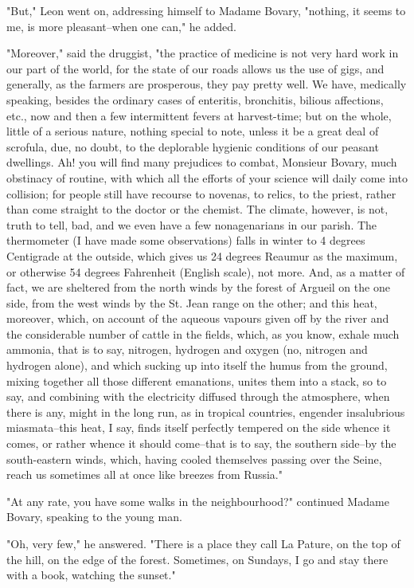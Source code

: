 \documentclass{tufte-book}
\begin{document}
"But," Leon went on, addressing himself to Madame Bovary, "nothing, it
seems to me, is more pleasant--when one can," he added.

"Moreover," said the druggist, "the practice of medicine is not very
hard work in our part of the world, for the state of our roads allows us
the use of gigs, and generally, as the farmers are prosperous, they pay
pretty well. We have, medically speaking, besides the ordinary cases
of enteritis, bronchitis, bilious affections, etc., now and then a
few intermittent fevers at harvest-time; but on the whole, little of a
serious nature, nothing special to note, unless it be a great deal of
scrofula, due, no doubt, to the deplorable hygienic conditions of our
peasant dwellings. Ah! you will find many prejudices to combat, Monsieur
Bovary, much obstinacy of routine, with which all the efforts of your
science will daily come into collision; for people still have recourse
to novenas, to relics, to the priest, rather than come straight to the
doctor or the chemist. The climate, however, is not, truth to tell, bad,
and we even have a few nonagenarians in our parish. The thermometer (I
have made some observations) falls in winter to 4 degrees Centigrade
at the outside, which gives us 24 degrees Reaumur as the maximum, or
otherwise 54 degrees Fahrenheit (English scale), not more. And, as a
matter of fact, we are sheltered from the north winds by the forest of
Argueil on the one side, from the west winds by the St. Jean range on
the other; and this heat, moreover, which, on account of the aqueous
vapours given off by the river and the considerable number of cattle
in the fields, which, as you know, exhale much ammonia, that is to say,
nitrogen, hydrogen and oxygen (no, nitrogen and hydrogen alone), and
which sucking up into itself the humus from the ground, mixing together
all those different emanations, unites them into a stack, so to say,
and combining with the electricity diffused through the atmosphere, when
there is any, might in the long run, as in tropical countries, engender
insalubrious miasmata--this heat, I say, finds itself perfectly tempered
on the side whence it comes, or rather whence it should come--that is to
say, the southern side--by the south-eastern winds, which, having cooled
themselves passing over the Seine, reach us sometimes all at once like
breezes from Russia."

"At any rate, you have some walks in the neighbourhood?" continued
Madame Bovary, speaking to the young man.

"Oh, very few," he answered. "There is a place they call La Pature, on
the top of the hill, on the edge of the forest. Sometimes, on Sundays, I
go and stay there with a book, watching the sunset."
\end{document}
